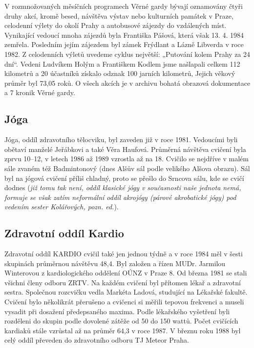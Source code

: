 V rozmnožovaných měsíčních programech Věrné gardy bývají oznamovány
čtyři druhy akcí, kromě besed, návštěva výstav nebo kulturních památek v
Praze, celodenní výlety do okolí Prahy a autobusové zájezdy do
vzdálených míst. Vynikající vedoucí mnoha zájezdů byla Františka Pášová,
která však 13. 4. 1984 zemřela. Posledním jejím zájezdem byl zámek
Frýdlant a Lázně Libverda v roce 1982. Z celodenních výletů uvedeme
cyklus největší: „Putování kolem Prahy za 24 dní``. Vedeni Ludvíkem
Holým a Františkem Kodlem jsme našlapali celkem 112 kilometrů a 20
účastníků získalo odznak 100 jarních kilometrů, Jejich věkový průměr byl
73,05 roků. O všech akcích je v archivu bohatá obrazová dokumentace a 7
kronik Věrné gardy.

\subsection{Jóga}\label{juxf3ga}

Jóga, oddíl zdravotního tělocviku, byl zaveden již v roce 1981.
Vedoucími byli obětaví manželé Jeřábkovi a také Věra Haufová. Průměrná
návštěva cvičení byla zprvu 10--12, v letech 1986 až 1989 vzrostla až na
18. Cvičilo se nejdříve v malém sále zvaném též Badmintonový (dnes Alšův
sál podle velikého Alšova obrazu). Sál byl na jógová cvičení příliš
chladný, proto se přešlo do Srncova sálu, kde se cvičí dodnes (\emph{již
tomu tak není, oddíl klasické jógy v současnosti naše jednota nemá,
formuje se však zatím neformální oddíl akrojógy (párové akrobatické
jógy) pod vedením sester Kolářových, pozn. ed.}).

\subsection{Zdravotní oddíl Kardio}\label{zdravotnuxed-odduxedl-kardio}

Zdravotní oddíl KARDIO cvičil také jen jednou týdně a v roce 1984 měl v
šesti skupinách průměrnou návštěvu 48,4. Byl založen a řízen MUDr.
Jarmilou Winterovou z kardiologického oddělení OÚNZ v Praze 8. Od března
1981 se stali všichni členy odboru ZRTV. Na každém cvičení byl přítomen
lékař a zdravotní sestra. Společnou rozcvičku vedla Markéta Ladová,
studující na Lékařské fakultě. Cvičení bylo několikrát přerušeno a
cvičenci si měřili tepovou frekvenci a museli vysadit při dosažení
předepsaného maxima. Podle lékařského vyšetření byli rozděleni do skupin
podle dovolené zátěže od 50 do 150 wattů. Počet cvičících kardiaků stále
vzrůstal až na průměr 64,3 v roce 1987. V březnu roku 1988 byl celý
oddíl převeden do zdravotního odboru TJ Meteor Praha.


